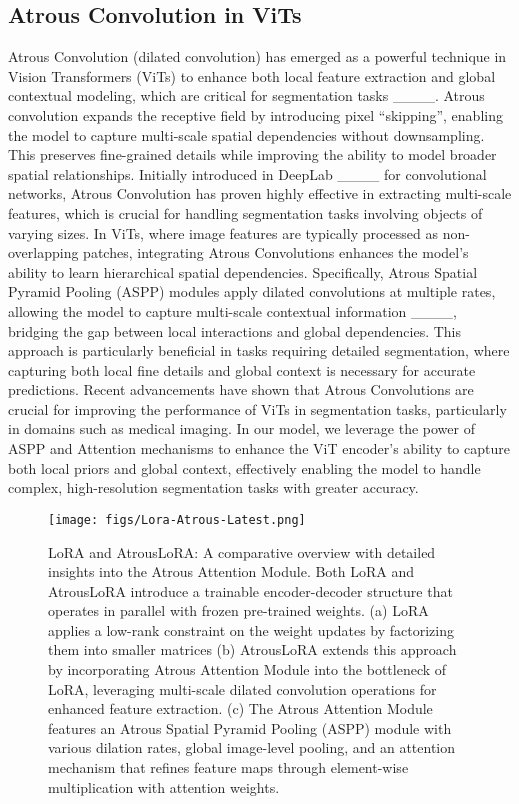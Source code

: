 \subsection{Atrous Convolution in ViTs}
Atrous Convolution (dilated convolution) has emerged as a powerful technique in Vision Transformers (ViTs) to enhance both local feature extraction and global contextual modeling, which are critical for segmentation tasks ____. Atrous convolution expands the receptive field by introducing pixel “skipping”, enabling the model to capture multi-scale spatial dependencies without downsampling. This preserves fine-grained details while improving the ability to model broader spatial relationships. Initially introduced in DeepLab ____ for convolutional networks, Atrous Convolution has proven highly effective in extracting multi-scale features, which is crucial for handling segmentation tasks involving objects of varying sizes. In ViTs, where image features are typically processed as non-overlapping patches, integrating Atrous Convolutions enhances the model’s ability to learn hierarchical spatial dependencies. Specifically, Atrous Spatial Pyramid Pooling (ASPP) modules apply dilated convolutions at multiple rates, allowing the model to capture multi-scale contextual information ____, bridging the gap between local interactions and global dependencies. This approach is particularly beneficial in tasks requiring detailed segmentation, where capturing both local fine details and global context is necessary for accurate predictions. Recent advancements have shown that Atrous Convolutions are crucial for improving the performance of ViTs in segmentation tasks, particularly in domains such as medical imaging. In our model, we leverage the power of ASPP and Attention mechanisms to enhance the ViT encoder’s ability to capture both local priors and global context, effectively enabling the model to handle complex, high-resolution segmentation tasks with greater accuracy.

\begin{figure*}[ht]
	\centering
	\texttt{[image: figs/Lora-Atrous-Latest.png]}
	\caption{LoRA and AtrousLoRA: A comparative overview with detailed insights into the Atrous Attention Module. Both LoRA and AtrousLoRA introduce a trainable encoder-decoder structure that operates in parallel with frozen pre-trained weights. (a) LoRA applies a low-rank constraint on the weight updates by factorizing them into smaller matrices (b) AtrousLoRA extends this approach by incorporating Atrous Attention Module into the bottleneck of LoRA, leveraging multi-scale dilated convolution operations for enhanced feature extraction. (c) The Atrous Attention Module features an Atrous Spatial Pyramid Pooling (ASPP) module with various dilation rates, global image-level pooling, and an attention mechanism that refines feature maps through element-wise multiplication with attention weights.}
	\label{fig2}
\end{figure*}